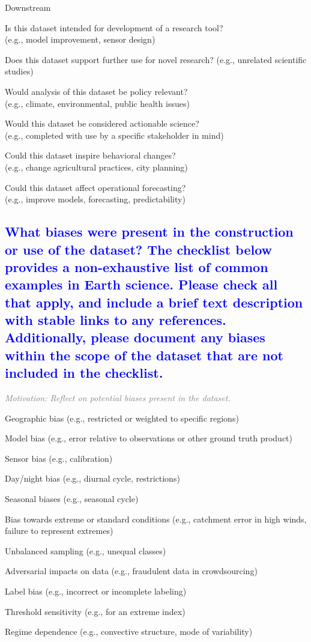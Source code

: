 \documentclass[letterpaper, 10 pt, transmag]{IEEEtran}
\begin{document}
Downstream
\begin{todolist}
  \item Is this dataset intended for development of a research tool? \\
  (e.g., model improvement, sensor design)
  \item Does this dataset support further use for novel research? (e.g., unrelated scientific studies)
  \item Would analysis of this dataset be policy relevant? \\
  (e.g., climate, environmental, public health issues)
  \item Would this dataset be considered actionable science? \\ 
  (e.g., completed with use by a specific stakeholder in mind)
  \item Could this dataset inspire behavioral changes? \\
  (e.g., change agricultural practices, city planning)
  \item Could this dataset affect operational forecasting? \\
  (e.g., improve models, forecasting, predictability)
\end{todolist}

\textcolor{blue}{\subsection{What biases were present in the construction or use of the dataset? The checklist below provides a non-exhaustive list of common examples in Earth science. Please check all that apply, and include a brief text description with stable links to any references. Additionally, please document any biases within the scope of the dataset that are not included in the checklist.}}
\textcolor{gray}{\textit{Motivation: Reflect on potential biases present in the dataset.}}

\begin{todolist}
    \item Geographic bias (e.g., restricted or weighted to specific regions)
    \item Model bias (e.g., error relative to observations or other ground truth product)
    \item Sensor bias (e.g., calibration)
    \item Day/night bias (e.g., diurnal cycle, restrictions)
    \item Seasonal biases (e.g., seasonal cycle)
    \item Bias towards extreme or standard conditions (e.g., catchment error in high winds, failure to represent extremes)
    \item Unbalanced sampling (e.g., unequal classes)
    \item Adversarial impacts on data (e.g., fraudulent data in crowdsourcing)
    \item Label bias (e.g., incorrect or incomplete labeling)
    \item Threshold sensitivity (e.g., for an extreme index)
    \item Regime dependence (e.g., convective structure, mode of variability)
\end{todolist}
\end{document}
